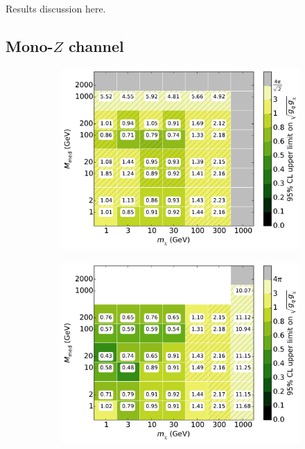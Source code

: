 Results discussion here.

\subsection{Mono-$Z$ channel}

\begin{figure}[h]
  \centering
    \begin{subfigure}[t]{0.495\textwidth}
      \centering
      \includegraphics[width=1.\textwidth]{figures/grid_allpoints_SVD_rat05.pdf}
      \caption{}
    \end{subfigure}
    \begin{subfigure}[t]{0.495\textwidth}
      \centering
      \includegraphics[width=1.\textwidth]{figures/grid_allpoints_SVD_rat1.pdf}

\end{subfigure}
\end{figure}
